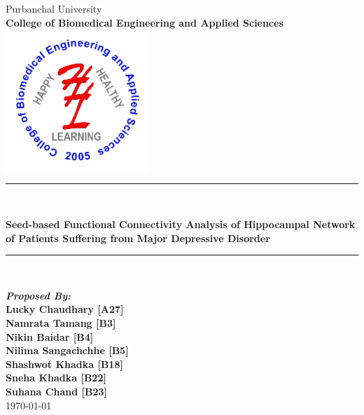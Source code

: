 ﻿\documentclass[12pt]{article}
\begin{document}
\begin{titlepage}

\newcommand{\HRule}{\rule{\linewidth}{0.1mm}}

\begin{center}

  {\huge Purbanchal University}\\[1cm]

  \textbf{\huge College of Biomedical Engineering and Applied Sciences}\\[1cm]


  \includegraphics[width=0.4\textwidth]{cbeas-logo.png}\\[1cm]

  \color{red} \HRule \\[0.4cm] \color{black}

  {\huge \bfseries Seed-based Functional Connectivity Analysis of
  Hippocampal Network of Patients Suffering from \linebreak Major
  Depressive Disorder}\\[0.2cm]

  \color{red} \HRule \\[2cm] \color{black}

  \textbf{\Large \textit{ Proposed By: } \\[5mm]
  \Large
  Lucky Chaudhary [A27] \\
  Namrata Tamang [B3] \\
  Nikin Baidar [B4] \\
  Nilima Sangachchhe [B5] \\
  Shashwot Khadka [B18] \\
  Sneha Khadka [B22] \\ [1mm]
  Suhana Chand [B23]} \\ [1cm]

  \vfill
  {\Large \today}

\end{center}

\end{titlepage}
\end{document}
